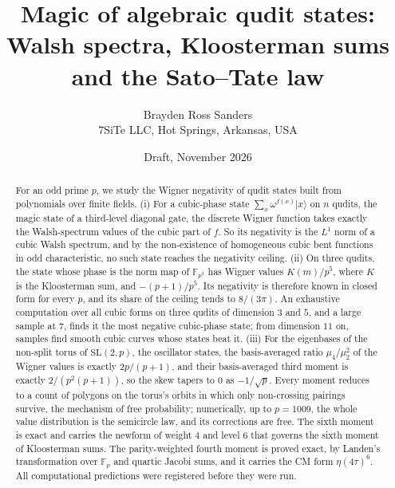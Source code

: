 \documentclass[11pt]{article}
\title{Magic of algebraic qudit states:\\ Walsh spectra, Kloosterman sums and the Sato--Tate law}
\author{Brayden Ross Sanders\\ \small 7SiTe LLC, Hot Springs, Arkansas, USA}
\date{Draft, November 2026}
\theoremstyle{remark}
\newcommand{\F}{\mathbb{F}}
\begin{document}
\maketitle

\begin{abstract}
For an odd prime $p$, we study the Wigner negativity of qudit states built from polynomials over finite fields.
(i) For a cubic-phase state $\sum_x \omega^{f(x)}|x\rangle$ on $n$ qudits, the magic state of a third-level diagonal
gate, the discrete Wigner function takes exactly the Walsh-spectrum values of the cubic part of $f$. So its
negativity is the $L^1$ norm of a cubic Walsh spectrum, and by the non-existence of homogeneous cubic bent functions in
odd characteristic, no such state reaches the negativity ceiling. (ii) On three qudits, the state whose phase is the
norm map of $\F_{p^3}$ has Wigner values $K(m)/p^5$, where $K$ is the Kloosterman sum, and $-(p+1)/p^5$. Its negativity
is therefore known in closed form for every $p$, and its share of the ceiling tends to $8/(3\pi)$. An exhaustive
computation over all cubic forms on three qudits of dimension $3$ and $5$, and a large sample at $7$, finds it the most
negative cubic-phase state; from dimension $11$ on, samples find smooth cubic curves whose states beat it.
(iii) For the eigenbases of the non-split torus of $\mathrm{SL}(2,p)$, the oscillator states, the basis-averaged ratio
$\mu_4/\mu_2^2$ of the Wigner values is exactly $2p/(p+1)$, and their basis-averaged third moment is exactly
$2/(p^2(p+1))$, so the skew tapers to $0$ as $-1/\sqrt p$. Every moment reduces to a count of polygons on the torus's
orbits in which only non-crossing pairings survive, the mechanism of free probability; numerically, up to $p=1009$,
the whole value distribution is the semicircle law, and its corrections are free. The sixth moment is exact and
carries the newform of weight $4$ and level $6$ that governs the sixth moment of Kloosterman sums. The
parity-weighted fourth moment is proved exact, by Landen's transformation over $\F_p$ and quartic Jacobi sums, and it
carries the CM form $\eta(4\tau)^6$. All computational predictions were registered before they were run.
\end{abstract}
\end{document}
